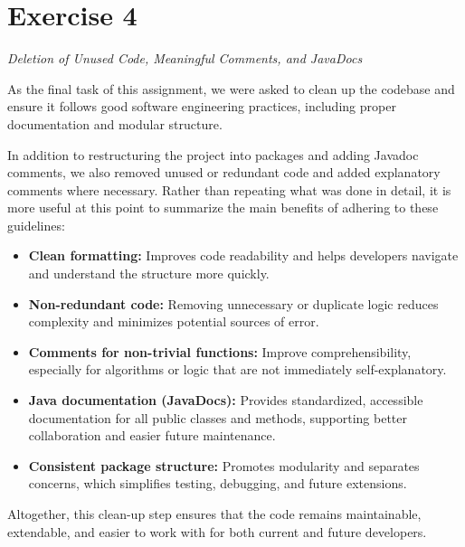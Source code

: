 \section*{Exercise 4}
\textit{Deletion of Unused Code, Meaningful Comments, and JavaDocs}

\noindent As the final task of this assignment, we were asked to clean up the codebase and ensure it follows good software engineering practices, including proper documentation and modular structure.

\noindent In addition to restructuring the project into packages and adding Javadoc comments, we also removed unused or redundant code and added explanatory comments where necessary. Rather than repeating what was done in detail, it is more useful at this point to summarize the main benefits of adhering to these guidelines:

\begin{itemize}
\item \textbf{Clean formatting:} Improves code readability and helps developers navigate and understand the structure more quickly.

\item \textbf{Non-redundant code:} Removing unnecessary or duplicate logic reduces complexity and minimizes potential sources of error.

\item \textbf{Comments for non-trivial functions:} Improve comprehensibility, especially for algorithms or logic that are not immediately self-explanatory.

\item \textbf{Java documentation (JavaDocs):} Provides standardized, accessible documentation for all public classes and methods, supporting better collaboration and easier future maintenance.

\item \textbf{Consistent package structure:} Promotes modularity and separates concerns, which simplifies testing, debugging, and future extensions.
\end{itemize}

\noindent Altogether, this clean-up step ensures that the code remains maintainable, extendable, and easier to work with for both current and future developers.
